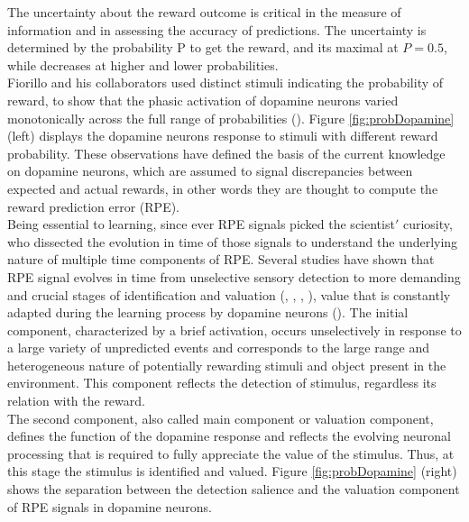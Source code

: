 The uncertainty about the reward outcome is critical in the measure of information and in assessing the accuracy of predictions. The uncertainty is determined by the probability P to get the reward, and its maximal at $P=0.5$, while decreases at higher and lower probabilities.\\Fiorillo and his collaborators used distinct stimuli indicating the probability of reward, to show that the phasic activation of dopamine neurons varied monotonically across the full range of probabilities (\cite{Fiorillo}). Figure \ref{fig:probDopamine} (left) displays the dopamine neurons response to stimuli with different reward probability. These observations have defined the basis of the current knowledge on dopamine neurons, which are assumed to signal discrepancies between expected and actual rewards, in other words they are thought to compute the reward prediction error (RPE).\\Being essential to learning, since ever RPE signals picked the scientist$'$ curiosity, who dissected the evolution in time of those signals to understand the underlying nature of multiple time components of RPE. Several studies have shown that RPE signal evolves in time from unselective sensory detection to more demanding and crucial stages of identification and valuation (\cite{Tobler2003}, \cite{Nomoto2010}, \cite{Fiorillo2013}, \cite{Schultz2016}), value that is constantly adapted during the learning process by dopamine neurons (\cite{Tobler2005}). The initial component, characterized by a brief activation, occurs unselectively in response to a large variety of unpredicted events and corresponds to the large range and heterogeneous nature of potentially rewarding stimuli and object present in the environment. This component reflects the detection of stimulus, regardless its relation with the reward.\\The second component, also called main component or valuation component, defines the function of the dopamine response and reflects the evolving neuronal processing that is required to fully appreciate the value of the stimulus. Thus, at this stage the stimulus is identified and valued. Figure \ref{fig:probDopamine} (right) shows the separation between the detection salience and the valuation component of RPE signals in dopamine neurons. %
